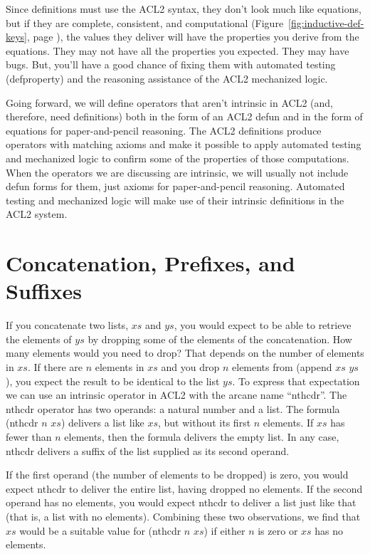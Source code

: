 Since definitions must use the ACL2 syntax,
they don't look much like equations,
but if they are complete, consistent, and computational
(Figure~\ref{fig:inductive-def-keys}, page \pageref{fig:inductive-def-keys}),
the values they deliver will have the properties you derive
from the equations.
They may not have all the properties you expected.
They may have bugs.
But, you'll have a good chance of fixing them with
automated testing (defproperty)
and the reasoning assistance of the ACL2 mechanized logic.

Going forward, we will define operators that aren't
intrinsic in ACL2 (and, therefore, need definitions)
both in the form of an ACL2 defun
and in the form of equations for paper-and-pencil reasoning.
The ACL2 definitions produce operators with matching axioms and
make it possible to apply automated testing and mechanized logic
to confirm some of the properties of those computations.
When the operators we are discussing are intrinsic,
we will usually not include defun forms for them,
just axioms for paper-and-pencil reasoning.
Automated testing and mechanized logic will make use
of their intrinsic definitions in the ACL2 system.

\section{Concatenation, Prefixes, and Suffixes}
\label{sec:append-prefix-suffix}

If you concatenate two lists, $xs$ and $ys$,
you would expect to be able to retrieve the elements
of $ys$ by dropping some of the elements of the concatenation.
How many elements would you need to drop?
That depends on the number of elements in $xs$.
If there are $n$ elements in $xs$ and you drop $n$ elements
from (append $xs$ $ys$), you expect the result to be identical
to the list $ys$. To express that expectation we can use
an intrinsic operator in ACL2 with the arcane name ``nthcdr''.
The nthcdr operator has two operands: a natural number and a list.
The formula (nthcdr $n$ $xs$) delivers a list like $xs$,
but without its first $n$ elements.
If $xs$ has fewer than $n$ elements,
then the formula delivers the empty list.
In any case, nthcdr delivers a suffix of the list
supplied as its second operand.

If the first operand (the number of elements to be dropped) is zero,
you would expect
nthcdr to deliver the entire list, having dropped no elements.
If the second operand has no elements,
you would expect
nthcdr to deliver a list just like that
(that is, a list with no elements).
Combining these two observations, we find that
$xs$ would be a suitable value for (nthcdr $n$ $xs$)
if either $n$ is zero or $xs$ has no elements.

